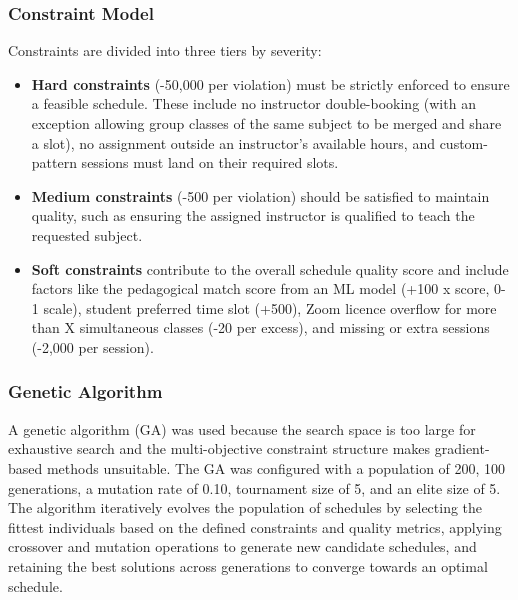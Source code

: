 \subsubsection{Constraint Model}

  Constraints are divided into three tiers by severity:        
  \begin{itemize}
    \item \textbf{Hard constraints} (-50,000 per violation) must be strictly enforced to ensure a feasible schedule. These include no instructor double-booking (with an exception allowing group classes of the same subject to be merged and share a slot), no assignment outside an instructor's available hours, and custom-pattern sessions must land on their required slots.
    \item \textbf{Medium constraints} (-500 per violation) should be satisfied to maintain quality, such as ensuring the assigned instructor is qualified to teach the requested subject.
    \item \textbf{Soft constraints} contribute to the overall schedule quality score and include factors like the pedagogical match score from an ML model (+100 x score, 0-1 scale), student preferred time slot (+500), Zoom licence overflow for more than X simultaneous classes (-20 per excess), and missing or extra sessions (-2,000 per session).
  \end{itemize}             

\subsubsection{Genetic Algorithm}
A genetic algorithm (GA) was used because the search space is too large for exhaustive search and the multi-objective constraint structure makes gradient-based methods unsuitable. The GA was configured with a population of 200, 100 generations, a mutation rate of 0.10, tournament size of 5, and an elite size of 5. 
The algorithm iteratively evolves the population of schedules by selecting the fittest individuals based on the defined constraints and quality metrics, applying crossover and mutation operations to generate new candidate schedules, and retaining the best solutions across generations to converge towards an optimal schedule.

